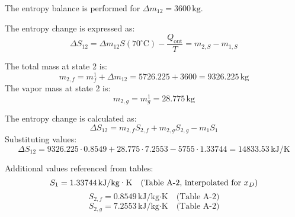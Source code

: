 The entropy balance is performed for \( \Delta m_{12} = 3600 \, \text{kg} \).  

The entropy change is expressed as:  
\[
\Delta S_{12} = \Delta m_{12} S(70^\circ\text{C}) - \frac{Q_{\text{out}}}{T} = m_{2,S} - m_{1,S}
\]  

The total mass at state 2 is:  
\[
m_{2,f} = m_f^1 + \Delta m_{12} = 5726.225 + 3600 = 9326.225 \, \text{kg}
\]  
The vapor mass at state 2 is:  
\[
m_{2,g} = m_g^1 = 28.775 \, \text{kg}
\]  

The entropy change is calculated as:  
\[
\Delta S_{12} = m_{2,f} S_{2,f} + m_{2,g} S_{2,g} - m_1 S_1
\]  
Substituting values:  
\[
\Delta S_{12} = 9326.225 \cdot 0.8549 + 28.775 \cdot 7.2553 - 5755 \cdot 1.33744 = 14833.53 \, \text{kJ/K}
\]  

Additional values referenced from tables:  
\[
S_1 = 1.33744 \, \text{kJ/kg·K} \quad \text{(Table A-2, interpolated for \( x_D \))}
\]  
\[
S_{2,f} = 0.8549 \, \text{kJ/kg·K} \quad \text{(Table A-2)}
\]  
\[
S_{2,g} = 7.2553 \, \text{kJ/kg·K} \quad \text{(Table A-2)}
\]